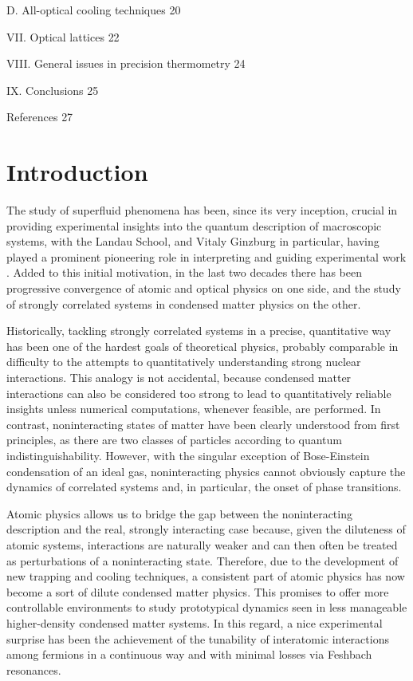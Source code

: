 \documentclass[pra,letterpaper,twocolumn,showpacs,superscriptaddress]{revtex4}
\begin{document}
\hspace{1.0cm} D. All-optical cooling techniques \hfill{20}

VII. Optical lattices \hfill{22}

VIII. General issues in precision thermometry \hfill{24}

IX. Conclusions \hfill{25}

References \hfill{27}

\vspace{1.0cm}

\section{\bf{Introduction}}
The study of superfluid phenomena has been, since its very inception, crucial in providing experimental 
insights into the quantum description of macroscopic systems, with the Landau School, and Vitaly Ginzburg in particular, 
having played a prominent pioneering role in interpreting and guiding experimental work \cite{Kapitza1938,Allen1938,Landau1941,Ginzburg2003}. 
Added to this initial motivation, in the last two decades there has been progressive convergence of atomic 
and optical physics on one side, and the study of strongly correlated systems in condensed matter physics on the other. 

Historically, tackling strongly correlated systems in a precise, quantitative way has been one of the hardest goals of theoretical 
physics, probably comparable in difficulty to the attempts to quantitatively understanding strong nuclear interactions. 
This analogy is not accidental, because condensed matter interactions can also be considered too strong to lead 
to quantitatively reliable insights unless numerical computations, whenever feasible, are performed. 
In contrast, noninteracting states of matter have been clearly understood from first principles, as there are two 
classes of particles according to quantum indistinguishability. However, with the singular exception of 
Bose-Einstein condensation of an ideal gas, noninteracting physics cannot obviously capture the dynamics of 
correlated systems and, in particular, the onset of phase transitions. 

Atomic physics allows us to bridge the gap between the noninteracting description and the 
real, strongly interacting case because, given the diluteness of atomic systems, interactions are 
naturally weaker and can then often be treated as perturbations of a noninteracting state. 
Therefore, due to the development of new trapping and cooling techniques, a consistent part of 
atomic physics has now become a sort of dilute condensed matter physics. 
This promises to offer more controllable environments to study prototypical dynamics seen in
less manageable higher-density condensed matter systems. In this regard, a nice experimental surprise 
has been the achievement of the tunability of interatomic interactions among fermions in a continuous way 
and with minimal losses via Feshbach resonances. 
\end{document}
